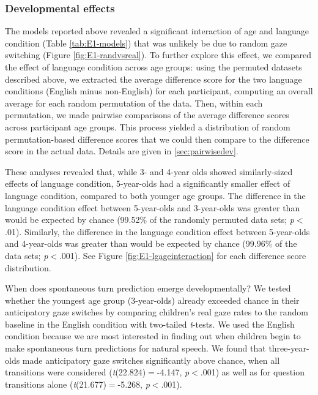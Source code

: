 \documentclass[authoryear, 12pt]{elsarticle}
\begin{document}
\subsubsection*{Developmental effects}

The models reported above revealed a significant interaction of age and language condition (Table \ref{tab:E1-models}) that was unlikely be due to random gaze switching (Figure \ref{fig:E1-randvsreal}). To further explore this effect, we compared the effect of language condition across age groups: using the permuted datasets described above, we extracted the average difference score for the two language conditions (English minus non-English) for each participant, computing an overall average for each random permutation of the data. Then, within each permutation, we made pairwise comparisons of the average difference scores across participant age groups. This process yielded a distribution of random permutation-based difference scores that we could then compare to the difference score in the actual data. Details are given in \ref{sec:pairwisedev}.

These analyses revealed that, while 3- and 4-year olds showed similarly-sized effects of language condition, 5-year-olds had a significantly smaller effect of language condition, compared to both younger age groups. The difference in the language condition effect between 5-year-olds and 3-year-olds was greater than would be expected by chance (99.52\% of the randomly permuted data sets; \textit{p}$<$.01). Similarly, the difference in the language condition effect between 5-year-olds and 4-year-olds was greater than would be expected by chance (99.96\% of the data sets; \textit{p}$<$.001). See Figure \ref{fig:E1-lgageinteraction} for each difference score distribution.

When does spontaneous turn prediction emerge developmentally? We tested whether the youngest age group (3-year-olds) already exceeded chance in their anticipatory gaze switches by comparing children's real gaze rates to the random baseline in the English condition with two-tailed \textit{t}-tests. We used the English condition because we are most interested in finding out when children begin to make spontaneous turn predictions for natural speech. We found that three-year-olds made anticipatory gaze switches significantly above chance, when all transitions were considered (\textit{t}(22.824)$=$-4.147, \textit{p}$<$.001) as well as for question transitions alone (\textit{t}(21.677)$=$-5.268, \textit{p}$<$.001).
\end{document}

